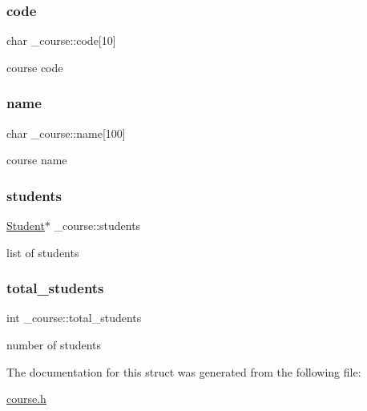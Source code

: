 \subsubsection{\texorpdfstring{code}{code}}
{\footnotesize\ttfamily char \+\_\+course\+::code\mbox{[}10\mbox{]}}

course code \mbox{\label{struct__course_a8a6f7d2171f18b5d13e86913345f381d}} 
\subsubsection{\texorpdfstring{name}{name}}
{\footnotesize\ttfamily char \+\_\+course\+::name\mbox{[}100\mbox{]}}

course name \mbox{\label{struct__course_a5cf448bc80f0f8c5f23402db23d41a00}} 
\subsubsection{\texorpdfstring{students}{students}}
{\footnotesize\ttfamily \mbox{\hyperlink{student_8h_abcfb362c0eb3182c835992cf3d0c0dd3}{Student}}$\ast$ \+\_\+course\+::students}

list of students \mbox{\label{struct__course_afd5e161f7cf358c13cc8aa868b462006}} 
\subsubsection{\texorpdfstring{total\+\_\+students}{total\_students}}
{\footnotesize\ttfamily int \+\_\+course\+::total\+\_\+students}

number of students 

The documentation for this struct was generated from the following file\+:\begin{DoxyCompactItemize}
\item 
\mbox{\hyperlink{course_8h}{course.\+h}}\end{DoxyCompactItemize}
